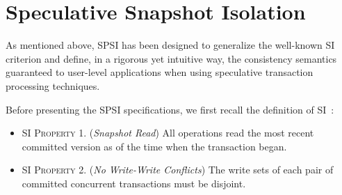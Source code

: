 



\section{Speculative Snapshot Isolation}
\label{subsec:ssi}
As mentioned above, SPSI has been designed to generalize the well-known SI criterion and define, in a rigorous yet intuitive way, the consistency semantics guaranteed to user-level applications when using speculative transaction processing techniques.

Before presenting the SPSI specifications, we first recall the definition of SI~\cite{weikum2001transactional}:

\begin{itemize}
\item \textsc{SI Property 1.} (\textit{Snapshot Read}) All operations read the most
recent committed version as of the time when the transaction began.
\item \textsc{SI Property 2.} (\textit{No Write-Write Conflicts}) The write sets of
each pair of committed concurrent transactions must be disjoint.
\end{itemize}

